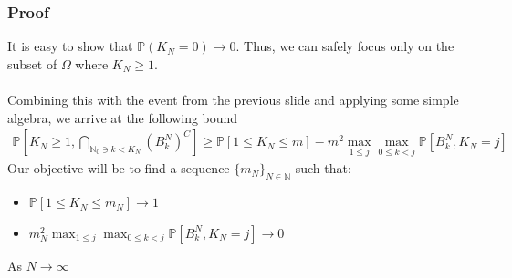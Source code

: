 \documentclass{beamer}
\begin{document}
\begin{frame}
    \frametitle{Proof}
    It is easy to show that $\mathbb{P}(K_N = 0) \rightarrow 0$. Thus, we can safely focus only on the subset of $\Omega$ where $K_N \geq 1$. \\~\\
    Combining this with the event from the previous slide and applying some simple algebra, we arrive at the following bound
    \small
    \begin{align*}
        \mathbb{P}\left[ K_N \geq 1,  \bigcap_{\mathbb{N}_0 \ni k < K_N}\left(B^N_k\right)^C \right]
        \geq  \mathbb{P}[1 \leq K_N \leq m] - m^2\max_{1 \leq j}\max_{0 \leq k < j}\mathbb{P}\left[ B^N_k, K_{N} = j \right]
    \end{align*}
    \normalsize
    Our objective will be to find a sequence $\{m_N\}_{N\in\mathbb{N}}$ such that:
    \begin{itemize}
        \item $\mathbb{P}[1 \leq K_N \leq m_N] \rightarrow 1$
        \item $m_N^2\max_{1 \leq j}\max_{0 \leq k < j}\mathbb{P}\left[ B^N_k, K_{N} = j \right] \rightarrow 0$ 
    \end{itemize}
    As $N \rightarrow \infty$
\end{frame}
\end{document}
